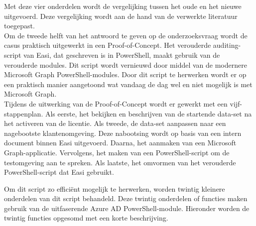 Met deze vier onderdelen wordt de vergelijking tussen het oude en het nieuwe uitgevoerd. Deze vergelijking wordt aan de hand van de verwerkte literatuur toegepast. \\

Om de tweede helft van het antwoord te geven op de onderzoeksvraag wordt de casus praktisch uitgewerkt in een Proof-of-Concept. Het verouderde auditing-script van Easi, dat geschreven is in PowerShell, maakt gebruik van de verouderde modules. Dit script wordt vernieuwd door middel van de modernere Microsoft Graph PowerShell-modules. Door dit script te herwerken wordt er op een praktisch manier aangetoond wat vandaag de dag wel en niet mogelijk is met Microsoft Graph. \\

Tijdens de uitwerking van de Proof-of-Concept wordt er gewerkt met een vijf-stappenplan. Als eerste, het bekijken en beschrijven van de startende data-set na het activeren van de licentie. Als tweede, de data-set aanpassen naar een nagebootste klantenomgeving. Deze nabootsing wordt op basis van een intern document binnen Easi uitgevoerd. Daarna, het aanmaken van een Microsoft Graph-applicatie. Vervolgens, het maken van een PowerShell-script om de testomgeving aan te spreken. Als laatste, het omvormen van het verouderde PowerShell-script dat Easi gebruikt.

Om dit script zo efficiënt mogelijk te herwerken, worden twintig kleinere onderdelen van dit script behandeld. Deze twintig onderdelen of functies maken gebruik van de uitfaserende Azure \ac{AD} PowerShell-module. Hieronder worden de twintig functies opgesomd met een korte beschrijving. 

